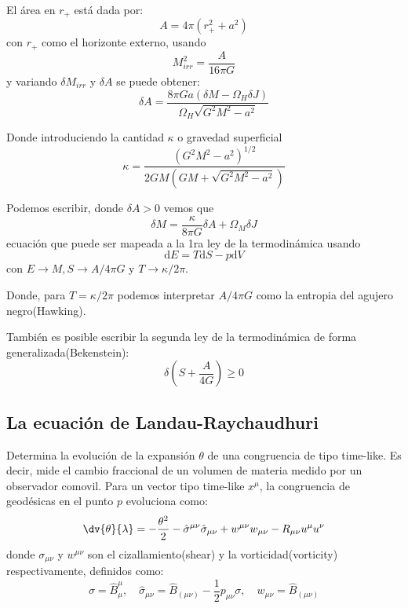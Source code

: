 \documentclass[../main]{subfiles}
\begin{document}
\begin{adjustwidth}{0pt}{-100pt}
El área en $r_+$ está dada por:
\begin{equation}
    A=4\pi(r^2_{+}+a^2)
\end{equation}
con $r_+$ como el horizonte externo, usando 
\begin{equation}
    M^2_{irr}=\dfrac{A}{16\pi G}
\end{equation}
y variando $\delta M_{irr}$ y $\delta A$ se puede obtener:
\begin{equation}
    \delta A=\dfrac{8\pi G a(\delta M-\Omega_H \delta J)}{\Omega_H\sqrt{G^2 M^2-a^2}}
\end{equation}

Donde introduciendo la cantidad $\kappa$ o gravedad superficial 
\begin{equation}
    \kappa=\dfrac{(G^2M^2-a^2)^{1/2}}{2GM(GM+\sqrt{G^2M^2-a^2})}
\end{equation}

Podemos escribir, donde $\delta A>0$ vemos que
\begin{equation}
    \delta M=\dfrac{\kappa}{8\pi G}\delta A+\Omega_M \delta J
\end{equation}
ecuación que puede ser mapeada a la 1ra ley de la termodinámica usando 
\begin{equation}
    \mathrm{d}E=T\mathrm{d}S-p\mathrm{d}V
\end{equation}
con $E\rightarrow M, S \rightarrow A/4\pi G$ y $T\rightarrow \kappa/2\pi$.

Donde, para $T=\kappa/2\pi$ podemos interpretar $A/4\pi G$ como la entropia del agujero negro(Hawking).

También es posible escribir la segunda ley de la termodinámica de forma generalizada(Bekenstein):
\begin{equation}
    \delta\left(S+\dfrac{A}{4G}\right)\geq 0
\end{equation}

\subsection{La ecuación de Landau-Raychaudhuri}
Determina la evolución de la expansión $\theta$ de una congruencia de tipo time-like. Es decir, mide el cambio fraccional de un volumen de materia medido por un observador comovil. Para un vector tipo time-like $x^{\mu}$, la congruencia de geodésicas en el punto $p$ evoluciona como:
\begin{equation}
    \dv{\theta}{\lambda}=-\dfrac{\theta^2}{2}-\hat{\sigma}^{\mu\nu}\hat{\sigma}_{\mu\nu}+w^{\mu\nu}w_{\mu\nu}-R_{\mu\nu}u^{\mu}u^{\nu}
\end{equation}
donde $\sigma_{\mu\nu}$ y $w^{\mu\nu}$ son el cizallamiento(shear) y la vorticidad(vorticity) respectivamente, definidos como:
\begin{equation}
    \sigma=\hat{B}^{\mu}_{\mu},\quad \hat{\sigma}_{\mu\nu}=\hat{B}_{(\mu\nu)}-\dfrac{1}{2}p_{\mu\nu}\sigma,\quad w_{\mu\nu}=\hat{B}_{(\mu\nu)}
\end{equation}


\end{adjustwidth}
\end{document}
